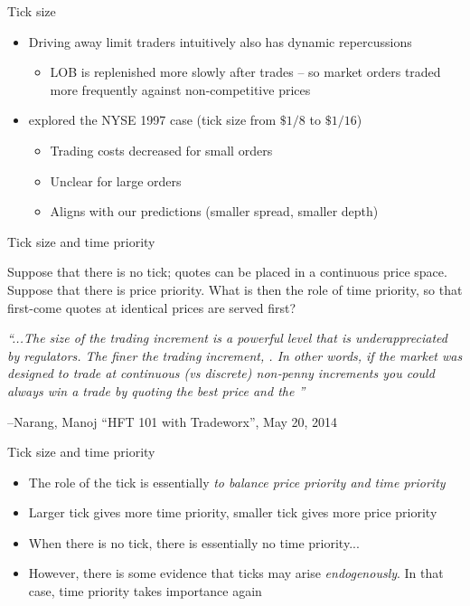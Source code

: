 \documentclass[english,10pt
,aspectratio=169
]{beamer}
\begin{document}
\begin{frame}{Tick size}
	\begin{itemize}
		\item Driving away limit traders intuitively also has dynamic repercussions
		\begin{itemize}
			\item LOB is replenished more slowly after trades -- so market orders traded more frequently against non-competitive prices
		\end{itemize}
		\item \cite{goldstein_eighths_2000} explored the NYSE 1997 case (tick size from $\$1/8$ to $\$1/16$)
		\begin{itemize}
			\item Trading costs decreased for small orders
			\item Unclear for large orders
			\item Aligns with our predictions (smaller spread, smaller depth)
		\end{itemize}
	\end{itemize}
\end{frame}


\begin{frame}{Tick size and time priority}
	\begin{exampleblock}{}
		Suppose that there is no tick; quotes can  be placed in a continuous price space. Suppose that there is price priority. What is then the role of time priority, so that first-come quotes at identical prices are served first?
	\end{exampleblock}
	
	\centering
	\emph{``...The size of the trading increment is a
	powerful level that is underappreciated by
	regulators. The \alert{finer the trading increment},
	. In other words, if the
	market was designed to trade at continuous
	(vs discrete) non‐penny increments you could
	always win a trade by quoting the best price
	and the ''}
	
	\begin{flushright}
		--Narang, Manoj ``HFT 101 with Tradeworx'',
		May 20, 2014
	\end{flushright}
\end{frame}


\begin{frame}{Tick size and time priority}
	\begin{itemize}
		\item The role of the tick is essentially \textit{to balance price priority and time priority}
		\item Larger tick gives more time priority, smaller tick gives more price priority
		\item When there is no tick, there is essentially no time priority...
		\item However, there is some evidence that ticks may arise \textit{endogenously}. In that case, time priority takes importance again
	\end{itemize}
\end{frame}
\end{document}
